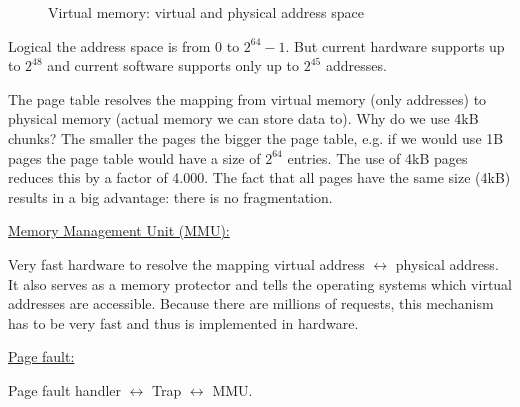 {{\begin{figure}[H]
			\caption{Virtual memory: virtual and physical address space}
			\label{fig:virtmem_virtphysaddrspace}
		\end{figure}
		\par{
			\noindent
			Logical the address space is from $0$ to $2^{64} - 1$. But current hardware supports up to $2^{48}$ and current software supports only up to $2^{45}$ addresses.
		}
		\par{
			\noindent
			The page table resolves the mapping from virtual memory (only addresses) to physical memory (actual memory we can store data to). \newline
			Why do we use 4kB chunks? The smaller the pages the bigger the page table, e.g. if we would use 1B pages the page table would have a size of $2^{64}$ entries. The use of 4kB pages reduces this by a factor of 4.000. The fact that all pages have the same size (4kB) results in a big advantage: there is no fragmentation.
		}
	}
	\par{
		\noindent\underline{Memory Management Unit (MMU):}
		\par{
			\noindent
			Very fast hardware to resolve the mapping virtual address $\leftrightarrow$ physical address. It also serves as a memory protector and tells the operating systems which virtual addresses are accessible. Because there are millions of requests, this mechanism has to be very fast and thus is implemented in hardware.
		}
	}
	\par{
		\noindent\underline{Page fault:}
		\par{\noindent Page fault handler $\leftrightarrow$ Trap $\leftrightarrow$ MMU.}
		\begin{figure}[H]
			\centering
\end{figure}}}
